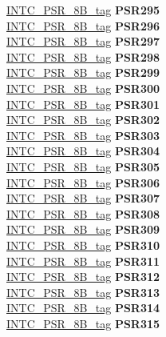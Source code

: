 \begin{DoxyCompactItemize}
\begin{tabbing}
\>\>\mbox{\hyperlink{unionINTC__PSR__8B__tag}{INTC\_PSR\_8B\_tag}} {\bfseries PSR295}\\
\>\>\mbox{\hyperlink{unionINTC__PSR__8B__tag}{INTC\_PSR\_8B\_tag}} {\bfseries PSR296}\\
\>\>\mbox{\hyperlink{unionINTC__PSR__8B__tag}{INTC\_PSR\_8B\_tag}} {\bfseries PSR297}\\
\>\>\mbox{\hyperlink{unionINTC__PSR__8B__tag}{INTC\_PSR\_8B\_tag}} {\bfseries PSR298}\\
\>\>\mbox{\hyperlink{unionINTC__PSR__8B__tag}{INTC\_PSR\_8B\_tag}} {\bfseries PSR299}\\
\>\>\mbox{\hyperlink{unionINTC__PSR__8B__tag}{INTC\_PSR\_8B\_tag}} {\bfseries PSR300}\\
\>\>\mbox{\hyperlink{unionINTC__PSR__8B__tag}{INTC\_PSR\_8B\_tag}} {\bfseries PSR301}\\
\>\>\mbox{\hyperlink{unionINTC__PSR__8B__tag}{INTC\_PSR\_8B\_tag}} {\bfseries PSR302}\\
\>\>\mbox{\hyperlink{unionINTC__PSR__8B__tag}{INTC\_PSR\_8B\_tag}} {\bfseries PSR303}\\
\>\>\mbox{\hyperlink{unionINTC__PSR__8B__tag}{INTC\_PSR\_8B\_tag}} {\bfseries PSR304}\\
\>\>\mbox{\hyperlink{unionINTC__PSR__8B__tag}{INTC\_PSR\_8B\_tag}} {\bfseries PSR305}\\
\>\>\mbox{\hyperlink{unionINTC__PSR__8B__tag}{INTC\_PSR\_8B\_tag}} {\bfseries PSR306}\\
\>\>\mbox{\hyperlink{unionINTC__PSR__8B__tag}{INTC\_PSR\_8B\_tag}} {\bfseries PSR307}\\
\>\>\mbox{\hyperlink{unionINTC__PSR__8B__tag}{INTC\_PSR\_8B\_tag}} {\bfseries PSR308}\\
\>\>\mbox{\hyperlink{unionINTC__PSR__8B__tag}{INTC\_PSR\_8B\_tag}} {\bfseries PSR309}\\
\>\>\mbox{\hyperlink{unionINTC__PSR__8B__tag}{INTC\_PSR\_8B\_tag}} {\bfseries PSR310}\\
\>\>\mbox{\hyperlink{unionINTC__PSR__8B__tag}{INTC\_PSR\_8B\_tag}} {\bfseries PSR311}\\
\>\>\mbox{\hyperlink{unionINTC__PSR__8B__tag}{INTC\_PSR\_8B\_tag}} {\bfseries PSR312}\\
\>\>\mbox{\hyperlink{unionINTC__PSR__8B__tag}{INTC\_PSR\_8B\_tag}} {\bfseries PSR313}\\
\>\>\mbox{\hyperlink{unionINTC__PSR__8B__tag}{INTC\_PSR\_8B\_tag}} {\bfseries PSR314}\\
\>\>\mbox{\hyperlink{unionINTC__PSR__8B__tag}{INTC\_PSR\_8B\_tag}} {\bfseries PSR315}\\

\end{tabbing}
\end{DoxyCompactItemize}
